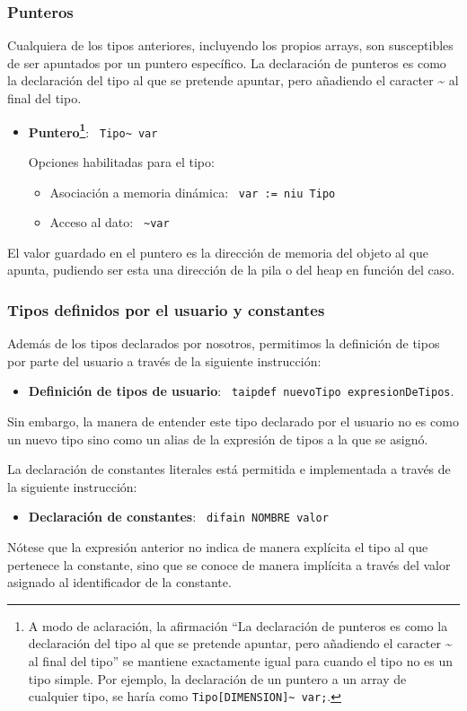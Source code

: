\documentclass[10pt,a4paper]{article}
\begin{document}
\subsubsection{Punteros}
Cualquiera de los tipos anteriores, incluyendo los propios arrays, son susceptibles de ser apuntados por un puntero específico. La declaración de punteros es como la declaración del tipo al que se pretende apuntar, pero añadiendo el caracter \~{} al final del tipo.
\begin{itemize}
    \item \textbf{Puntero\footnote{A modo de aclaración, la afirmación ``La declaración de punteros es como la declaración del tipo al que se pretende apuntar, pero añadiendo el caracter \~{} al final del tipo'' se mantiene exactamente igual para cuando el tipo no es un tipo simple. Por ejemplo, la declaración de un puntero a un array de cualquier tipo, se haría como \texttt{Tipo[DIMENSION]\~{} var;}.}}: \texttt{\color{blue} Tipo\~{} var}
    
    Opciones habilitadas para el tipo:
    \begin{itemize}
        \item Asociación a memoria dinámica: \texttt{\color{blue} var := niu Tipo}
        \item Acceso al dato: \texttt{\color{blue} \~{}var}
    \end{itemize}
\end{itemize}
El valor guardado en el puntero es la dirección de memoria del objeto al que apunta, pudiendo ser esta una dirección de la pila o del heap en función del caso.

\subsubsection{Tipos definidos por el usuario y constantes}
Además de los tipos declarados por nosotros, permitimos la definición de tipos por parte del usuario a través de la siguiente instrucción:
\begin{itemize}
    \item \textbf{Definición de tipos de usuario}: \texttt{\color{blue} taipdef nuevoTipo expresionDeTipos}.
\end{itemize}
Sin embargo, la manera de entender este tipo declarado por el usuario no es como un nuevo tipo sino como un alias de la expresión de tipos a la que se asignó.

La declaración de constantes literales está permitida e implementada a través de la siguiente instrucción:
\begin{itemize}
    \item \textbf{Declaración de constantes}: \texttt{\color{blue} difain NOMBRE valor}
\end{itemize}
Nótese que la expresión anterior no indica de manera explícita el tipo al que pertenece la constante, sino que se conoce de manera implícita a través del valor asignado al identificador de la constante.
\end{document}
